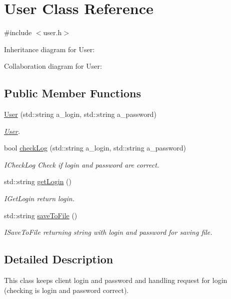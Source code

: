 \hypertarget{classUser}{}\section{User Class Reference}
\label{classUser}


{\ttfamily \#include $<$user.\+h$>$}



Inheritance diagram for User\+:


Collaboration diagram for User\+:
\subsection*{Public Member Functions}
\begin{DoxyCompactItemize}
\item 
\hyperlink{classUser_adf70eef5e6d21f9a84290dc4aa1d5f21}{User} (std\+::string a\+\_\+login, std\+::string a\+\_\+password)
\begin{DoxyCompactList}\small\item\em \hyperlink{classUser}{User}. \end{DoxyCompactList}\item 
bool \hyperlink{classUser_a4c05d709c1c8799ce275b4b7527b032c}{check\+Log} (std\+::string a\+\_\+login, std\+::string a\+\_\+password)
\begin{DoxyCompactList}\small\item\em I\+Check\+Log Check if login and password are correct. \end{DoxyCompactList}\item 
std\+::string \hyperlink{classUser_ac133b423690d15796ae0b17966adee76}{get\+Login} ()
\begin{DoxyCompactList}\small\item\em I\+Get\+Login return login. \end{DoxyCompactList}\item 
std\+::string \hyperlink{classUser_aaeccbfa5150f36307e5b23a87ff6fcd4}{save\+To\+File} ()
\begin{DoxyCompactList}\small\item\em I\+Save\+To\+File returning string with login and password for saving file. \end{DoxyCompactList}\end{DoxyCompactItemize}


\subsection{Detailed Description}
This class keeps client login and password and handling request for login (checking is login and password correct). 

